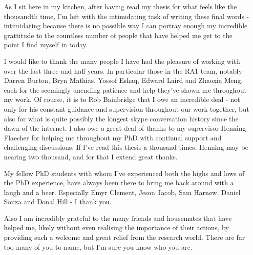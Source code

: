 
\begin{acknowledgements}      






\begin{spacing}{1}
As I sit here in my kitchen, after having read my thesis for what feels like
the
thousandth time, I'm left with the intimidating task of writing these final
words - intimidating because there is no possible way I can portray enough my
incredible grattitude to the countless number of people that have helped me
get to the point I find myself in today.

I would like to thank the many people I have had the pleasure of working with
over the last three and half years. In particular those in
the RA1 team, notably Darren Burton, Bryn Mathias, Yossof Eshaq, Edward
Laird and Zhaoxia Meng, each for the seemingly unending patience and help
they've shown me throughout my work. Of course, it is to Rob Bainbridge that I
owe an incredible deal - not only for his constant guidance and supervision
throughout our work together, but also for what is quite possibly the longest
skype conversation history since the dawn of the internet.
I also owe a great deal of thanks to my supervisor Henning Flaecher for helping
me throughout my PhD with continual support and challenging discussions. If I've
read this thesis a thousand times, Henning may be nearing two thousand, and for
that I extend great thanks.

My fellow PhD students with whom I've experienced both the highs and lows of
the PhD experience, have always been there to bring me back around with a laugh
and a beer. Especially Emyr Clement, Jeson Jacob, Sam Harnew, Daniel Souza and
Donal Hill - I thank you.

Also I am incredibly grateful to the many friends and housemates that have helped me, likely without
even realising the importance of their actions, by
providing such a welcome and great relief from the research world. There are
far too many of you to name, but I'm sure you know who you are.


\end{spacing}
\end{acknowledgements}
